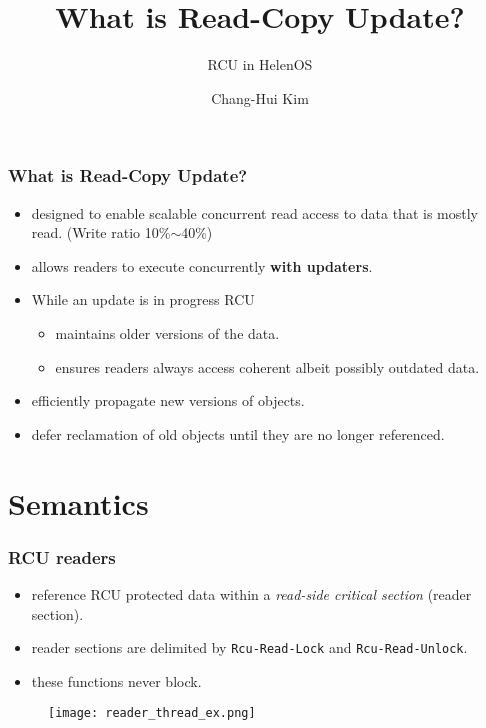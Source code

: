 \documentclass{beamer}
\title{What is Read-Copy Update?}
\subtitle{RCU in HelenOS}
\author{Chang-Hui Kim}
\begin{document}
\begin{frame}
  \titlepage
\end{frame}


\begin{frame}[t]
  \frametitle{What is Read-Copy Update?}

  \begin{itemize}
  \item designed to enable scalable concurrent read access to data that is mostly read.
    (Write ratio 10\%$\sim$40\%)
  \item allows readers to execute concurrently \textbf{with updaters}.
  \item While an update is in progress RCU
    \begin{itemize}
    \item maintains older versions of the data.
    \item ensures readers always access coherent albeit possibly outdated data.
    \end{itemize}
  \item efficiently propagate new versions of objects.
  \item defer reclamation of old objects until they are no longer referenced.
  \end{itemize}
  
\end{frame}


\section{Semantics}


\begin{frame}[t]
  \frametitle{RCU readers}

  \begin{itemize}
  \item reference RCU protected data within a \emph{read-side critical section}
    (reader section).
  \item reader sections are delimited by \texttt{Rcu-Read-Lock} and
    \texttt{Rcu-Read-Unlock}.
  \item these functions never block.
  \end{itemize}

  \begin{figure}[ht]
    \centering
    \texttt{[image: reader\_thread\_ex.png]}
  \end{figure}

  
\end{frame}
\end{document}
